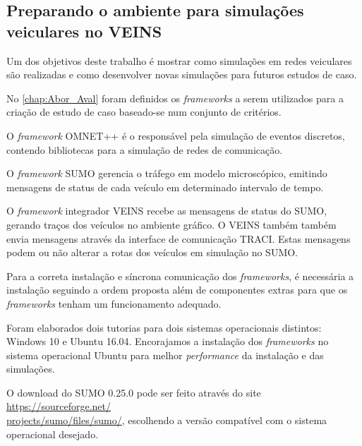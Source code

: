 \documentclass[
12pt,				%
openright,			%
oneside,			%
a4paper,			%
brazil,				%
]{abntex2}
\begin{document}
{\begin{anexosenv}
	    \newpage

		\chapter{\label{tutorial_1}Preparando o ambiente para simulações veiculares no VEINS}

		    \par Um dos objetivos deste trabalho é mostrar como simulações em redes veiculares são realizadas e como desenvolver novas simulações para futuros estudos de caso. %

		    \par No \autoref{chap:Abor_Aval} foram definidos os \textit{frameworks} a serem utilizados para a criação de estudo de caso baseado-se num conjunto de critérios. 

		    \par O \textit{framework} OMNET++ é o responsável pela simulação de eventos discretos, contendo bibliotecas para a simulação de redes de comunicação. 

		    \par O \textit{framework} SUMO gerencia o tráfego em modelo microscópico, emitindo mensagens de status de cada veículo em determinado intervalo de tempo. 

		    \par O \textit{framework} integrador VEINS recebe as mensagens de status do SUMO, gerando traços dos veículos no ambiente gráfico. O VEINS também também envia mensagens através da interface de comunicação TRACI. Estas mensagens podem ou não alterar a rotas dos veículos em simulação no SUMO.

		    \par Para a correta instalação e síncrona comunicação dos \textit{frameworks}, é necessária a instalação seguindo a ordem proposta além de componentes extras para que os \textit{frameworks} tenham um funcionamento adequado. 

		    \par Foram elaborados dois tutorias para dois sistemas operacionais distintos: Windows 10 e Ubuntu 16.04. Encorajamos a instalação dos \textit{frameworks} no sistema operacional Ubuntu para melhor \textit{performance} da instalação e das simulações.

		    \par O download do SUMO 0.25.0 pode ser feito através do site \href{https://sourceforge.net/projects/sumo/files/sumo/}{https://sourceforge.net/\\projects/sumo/files/sumo/}, escolhendo a versão compatível com o sistema operacional desejado. %


\end{anexosenv}}
\end{document}
